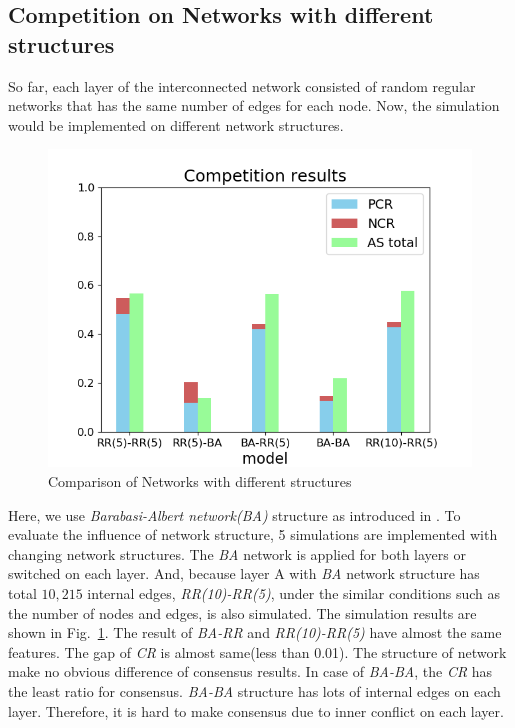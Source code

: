 \documentclass[english]{cccconf}
\begin{document}
\subsection{Competition on Networks with different structures}
So far, each layer of the interconnected network consisted of random regular networks that has the same number of edges for each node. Now, the simulation would be implemented on different network structures. 

\begin{figure}[!htb]
	\centering
	\includegraphics[width=\hsize]{FIG6.png}
	\caption{Comparison of Networks with different structures}
	\label{Fig6}
\end{figure}

Here, we use \textit{Barabasi-Albert network(BA)} structure as introduced in \cite{barabasi1999}. To evaluate the influence of network structure, 5 simulations are implemented with changing network structures. The \textit{BA} network is applied for both layers or switched on each layer. And, because layer A with \textit{BA} network structure has total $10,215$ internal edges, \textit{RR(10)-RR(5)}, under the similar conditions such as the number of nodes and edges, is also simulated. The simulation results are shown in Fig.~\ref{Fig6}. The result of \textit{BA-RR} and \textit{RR(10)-RR(5)} have almost the same features. The gap of \textit{CR} is almost same(less than 0.01). The structure of network make no obvious difference of consensus results. In case of \textit{BA-BA}, the \textit{CR} has the least ratio for consensus. \textit{BA-BA} structure has lots of internal edges on each layer. Therefore, it is hard to make consensus due to inner conflict on each layer. 
\end{document}
